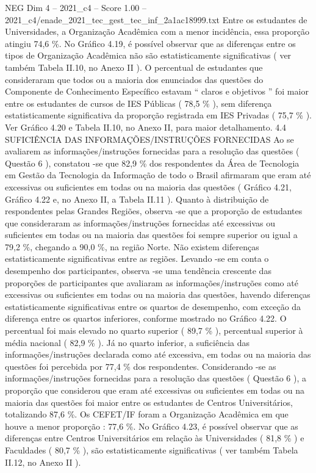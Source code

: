 \begin{textsample}{NEG Dim 4 – 2021\_c4 – Score 1.00 – 2021\_c4/enade\_2021\_tec\_gest\_tec\_inf\_2a1ac18999.txt}
Entre os estudantes de Universidades, a Organização Acadêmica com a menor incidência, essa proporção atingiu 74,6 \%.
No Gráfico 4.19, é possível observar que as diferenças entre os tipos de Organização Acadêmica não são estatisticamente significativas ( ver também Tabela II.10, no Anexo II ).
O percentual de estudantes que consideraram que todos ou a maioria dos enunciados das questões do Componente de Conhecimento Específico estavam “ claros e objetivos ” foi maior entre os estudantes de cursos de IES Públicas ( 78,5 \% ), sem diferença estatisticamente significativa da proporção registrada em IES Privadas ( 75,7 \% ).
Ver Gráfico 4.20 e Tabela II.10, no Anexo II, para maior detalhamento. 4.4 SUFICIÊNCIA DAS INFORMAÇÕES/INSTRUÇÕES FORNECIDAS Ao se avaliarem as informações/instruções fornecidas para a resolução das questões ( Questão 6 ), constatou -se que 82,9 \% dos respondentes da Área de Tecnologia em Gestão da Tecnologia da Informação de todo o Brasil afirmaram que eram até excessivas ou suficientes em todas ou na maioria das questões ( Gráfico 4.21, Gráfico 4.22 e, no Anexo II, a Tabela II.11 ).
Quanto à distribuição de respondentes pelas Grandes Regiões, observa -se que a proporção de estudantes que consideraram as informações/instruções fornecidas até excessivas ou suficientes em todas ou na maioria das questões foi sempre superior ou igual a 79,2 \%, chegando a 90,0 \%, na região Norte.
Não existem diferenças estatisticamente significativas entre as regiões.
Levando -se em conta o desempenho dos participantes, observa -se uma tendência crescente das proporções de participantes que avaliaram as informações/instruções como até excessivas ou suficientes em todas ou na maioria das questões, havendo diferenças estatisticamente significativas entre os quartos de desempenho, com exceção da diferença entre os quartos inferiores, conforme mostrado no Gráfico 4.22.
O percentual foi mais elevado no quarto superior ( 89,7 \% ), percentual superior à média nacional ( 82,9 \% ).
Já no quarto inferior, a suficiência das informações/instruções declarada como até excessiva, em todas ou na maioria das questões foi percebida por 77,4 \% dos respondentes.
Considerando -se as informações/instruções fornecidas para a resolução das questões ( Questão 6 ), a proporção que considerou que eram até excessivas ou suficientes em todas ou na maioria das questões foi maior entre os estudantes de Centros Universitários, totalizando 87,6 \%.
Os CEFET/IF foram a Organização Acadêmica em que houve a menor proporção : 77,6 \%.
No Gráfico 4.23, é possível observar que as diferenças entre Centros Universitários em relação às Universidades ( 81,8 \% ) e Faculdades ( 80,7 \% ), são estatisticamente significativas ( ver também Tabela II.12, no Anexo II ).

\end{textsample}
